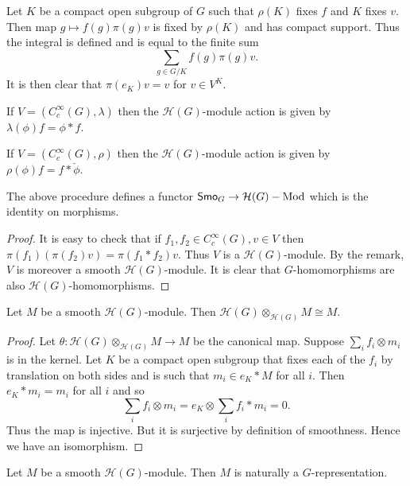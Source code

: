 \documentclass{memoir}
\begin{document}
\begin{remark}
    Let $K$ be a compact open subgroup of $G$ such that $\rho(K)$ fixes $f$ and $K$ fixes $v$.
    Then map $g\mapsto f(g)\pi(g)v$ is fixed by $\rho(K)$ and has compact support.
    Thus the integral is defined and is equal to the finite sum
    \begin{equation}
        \sum_{g\in G/K}f(g)\pi(g)v.
    \end{equation}
    It is then clear that $\pi(e_K)v = v$ for $v\in V^K$.
\end{remark}
\begin{remark}
    If $V = (C_c^\infty(G),\lambda)$ then the $\mathcal H(G)$-module action is given by $\lambda(\phi)f = \phi*f$.

    If $V = (C_c^\infty(G),\rho)$ then the $\mathcal H(G)$-module action is given by $\rho(\phi)f = f*\check\phi$.
\end{remark}
\begin{proposition}
    The above procedure defines a functor ${\normalfont\mathsf{Smo}}_G\to \mathcal H(G)-\text{Mod}$ which is the identity on morphisms.
\end{proposition}
\begin{proof}
    It is easy to check that if $f_1,f_2\in C_c^\infty(G),v\in V$ then $\pi(f_1)(\pi(f_2)v) = \pi(f_1*f_2)v$.
    Thus $V$ is a $\mathcal H(G)$-module.
    By the remark, $V$ is moreover a smooth $\mathcal H(G)$-module.
    It is clear that $G$-homomorphisms are also $\mathcal H(G)$-homomorphisms.
\end{proof}
\begin{lemma}
    Let $M$ be a smooth $\mathcal H(G)$-module.
    Then $\mathcal H(G) \otimes_{\mathcal H(G)}M \cong M$.
\end{lemma}
\begin{proof}
    Let $\theta:\mathcal H(G)\otimes_{\mathcal H(G)} M \to M$ be the canonical map.
    Suppose $\sum_if_i\otimes m_i$ is in the kernel.
    Let $K$ be a compact open subgroup that fixes each of the $f_i$ by translation on both sides and is such that $m_i\in e_K*M$ for all $i$.
    Then $e_K*m_i = m_i$ for all $i$ and so 
    \begin{equation}
        \sum_if_i\otimes m_i = e_K\otimes\sum_if_i*m_i = 0.
    \end{equation}
    Thus the map is injective.
    But it is surjective by definition of smoothness.
    Hence we have an isomorphism.
\end{proof}
\begin{corollary}
    Let $M$ be a smooth $\mathcal H(G)$-module.
    Then $M$ is naturally a $G$-representation.
\end{corollary}
\end{document}
